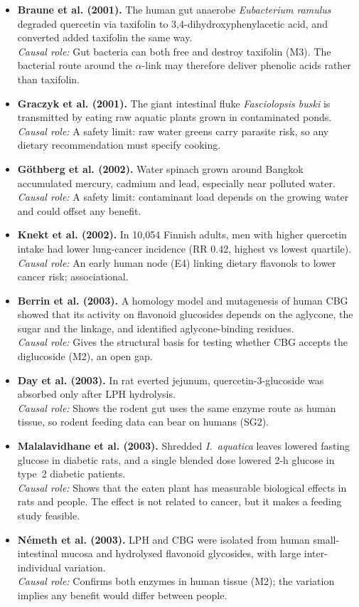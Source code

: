 \documentclass[11pt,a4paper]{article}
\newenvironment{litlist}{\begin{itemize}[leftmargin=2.6em,labelwidth=2.2em,labelsep=0.4em,align=left,itemsep=5pt,topsep=4pt]}{\end{itemize}}
\newcommand{\litentry}[4]{\item[\cite{#1}] \textbf{\color{navy}#2.} #3\\[1pt]
  {\color{teal}\textit{Causal role:}} #4}
\newcommand{\Ia}{\emph{I.~aquatica}}
\begin{document}
\begin{litlist}
\litentry{braune2001}{Braune et al. (2001)}{The human gut anaerobe \emph{Eubacterium ramulus} degraded quercetin via taxifolin to 3,4-dihydroxyphenylacetic acid, and converted added taxifolin the same way.}{Gut bacteria can both free and destroy taxifolin (M3). The bacterial route around the $\alpha$-link may therefore deliver phenolic acids rather than taxifolin.}

\litentry{graczyk2001}{Graczyk et al. (2001)}{The giant intestinal fluke \emph{Fasciolopsis buski} is transmitted by eating raw aquatic plants grown in contaminated ponds.}{A safety limit: raw water greens carry parasite risk, so any dietary recommendation must specify cooking.}

\litentry{gothberg2002}{G\"othberg et al. (2002)}{Water spinach grown around Bangkok accumulated mercury, cadmium and lead, especially near polluted water.}{A safety limit: contaminant load depends on the growing water and could offset any benefit.}

\litentry{knekt2002}{Knekt et al. (2002)}{In 10{,}054 Finnish adults, men with higher quercetin intake had lower lung-cancer incidence (RR 0.42, highest vs lowest quartile).}{An early human node (E4) linking dietary flavonols to lower cancer risk; associational.}

\litentry{berrin2003}{Berrin et al. (2003)}{A homology model and mutagenesis of human CBG showed that its activity on flavonoid glucosides depends on the aglycone, the sugar and the linkage, and identified aglycone-binding residues.}{Gives the structural basis for testing whether CBG accepts the diglucoside (M2), an open gap.}

\litentry{day2003}{Day et al. (2003)}{In rat everted jejunum, quercetin-3-glucoside was absorbed only after LPH hydrolysis.}{Shows the rodent gut uses the same enzyme route as human tissue, so rodent feeding data can bear on humans (SG2).}

\litentry{malalavidhane2003}{Malalavidhane et al. (2003)}{Shredded \Ia{} leaves lowered fasting glucose in diabetic rats, and a single blended dose lowered 2-h glucose in type~2 diabetic patients.}{Shows that the eaten plant has measurable biological effects in rats and people. The effect is not related to cancer, but it makes a feeding study feasible.}

\litentry{nemeth2003}{N\'emeth et al. (2003)}{LPH and CBG were isolated from human small-intestinal mucosa and hydrolysed flavonoid glycosides, with large inter-individual variation.}{Confirms both enzymes in human tissue (M2); the variation implies any benefit would differ between people.}


\end{litlist}
\end{document}
